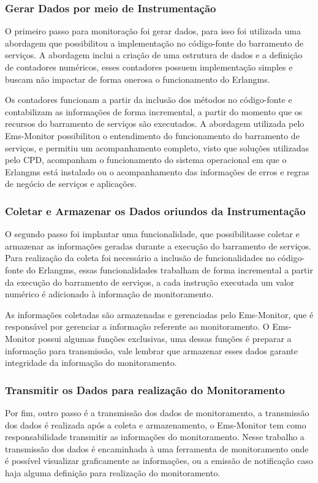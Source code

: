 \subsubsection{Gerar Dados por meio de Instrumentação}
O primeiro passo para monitoração foi gerar dados, para isso foi utilizada uma abordagem que possibilitou a implementação no código-fonte do barramento de serviços. A abordagem inclui a criação de uma estrutura de dados e a definição de contadores numéricos, esses contadores possuem implementação simples e buscam não impactar de forma onerosa o funcionamento do Erlangms.

Os contadores funcionam a partir da inclusão dos métodos no código-fonte e contabilizam as informações de forma incremental, a partir do momento que os recursos do barramento de serviços são executados. A abordagem utilizada pelo Ems-Monitor possibilitou o entendimento do funcionamento do barramento de serviços, e permitiu um acompanhamento completo, visto que soluções utilizadas pelo \acrshort{CPD}, acompanham o funcionamento do sistema operacional em que o Erlangms está instalado ou o acompanhamento das informações de erros e regras de negócio de serviços e aplicações.      

\subsubsection{Coletar e Armazenar os Dados oriundos da Instrumentação}
O segundo passo foi implantar uma funcionalidade, que possibilitasse coletar e armazenar as informações geradas durante a execução do barramento de serviços. Para realização da coleta foi necessário a inclusão de funcionalidades no código-fonte do Erlangms, essas funcionalidades trabalham de forma incremental a partir da execução do barramento de serviços, a cada instrução executada um valor numérico é adicionado à informação de monitoramento. 

As informações coletadas são armazenadas e gerenciadas pelo Ems-Monitor, que é responsável por gerenciar a informação referente ao monitoramento. O Ems-Monitor possui algumas funções exclusivas, uma dessas funções é preparar a informação para transmissão, vale lembrar que armazenar esses dados garante integridade da informação do monitoramento.

\subsubsection{Transmitir os Dados para realização do Monitoramento}
Por fim, outro passo é a transmissão dos dados de monitoramento, a transmissão dos dados é realizada após a coleta e armazenamento, o Ems-Monitor tem como responsabilidade transmitir as informações do monitoramento. Nesse trabalho a transmissão dos dados é encaminhada à uma ferramenta de monitoramento onde é possível visualizar graficamente as informações, ou a emissão de notificação caso haja alguma definição para realização do monitoramento.

